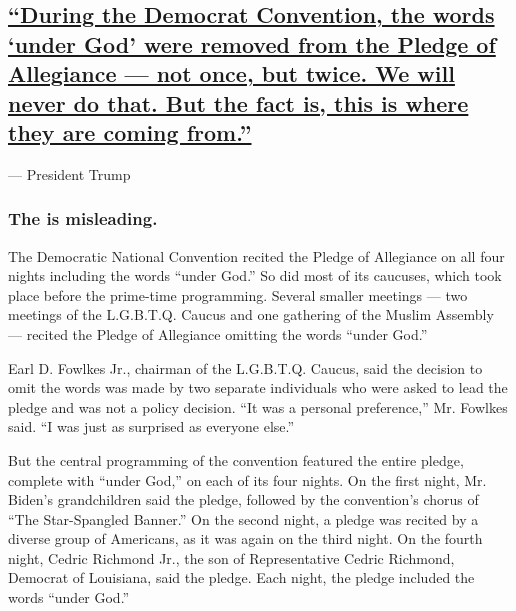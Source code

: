 \hypertarget{during-the-democrat-convention-the-words-under-god-were-removed-from-the-pledge-of-allegiance--not-once-but-twice-we-will-never-do-that-but-the-fact-is-this-is-where-they-are-coming-from}{%
\subsection{\texorpdfstring{\protect\hyperlink{during-the-democrat-convention-the-words-under-god-were-removed-from-the-pledge-of-allegiance-not-once-but-twice-we-will-never-d}{``During
the Democrat Convention, the words `under God' were removed from the
Pledge of Allegiance --- not once, but twice. We will never do that. But
the fact is, this is where they are coming
from.''}}{``During the Democrat Convention, the words `under God' were removed from the Pledge of Allegiance --- not once, but twice. We will never do that. But the fact is, this is where they are coming from.''}}\label{during-the-democrat-convention-the-words-under-god-were-removed-from-the-pledge-of-allegiance--not-once-but-twice-we-will-never-do-that-but-the-fact-is-this-is-where-they-are-coming-from}}

--- President Trump

\hypertarget{the-is-misleading}{%
\subsubsection{The is misleading.}\label{the-is-misleading}}

The Democratic National Convention recited the Pledge of Allegiance on
all four nights including the words ``under God.'' So did most of its
caucuses, which took place before the prime-time programming. Several
smaller meetings --- two meetings of the L.G.B.T.Q. Caucus and one
gathering of the Muslim Assembly --- recited the Pledge of Allegiance
omitting the words ``under God.''

Earl D. Fowlkes Jr., chairman of the L.G.B.T.Q. Caucus, said the
decision to omit the words was made by two separate individuals who were
asked to lead the pledge and was not a policy decision. ``It was a
personal preference,'' Mr. Fowlkes said. ``I was just as surprised as
everyone else.''

But the central programming of the convention featured the entire
pledge, complete with ``under God,'' on each of its four nights. On the
first night, Mr. Biden's grandchildren said the pledge, followed by the
convention's chorus of ``The Star-Spangled Banner.'' On the second
night, a pledge was recited by a diverse group of Americans, as it was
again on the third night. On the fourth night, Cedric Richmond Jr., the
son of Representative Cedric Richmond, Democrat of Louisiana, said the
pledge. Each night, the pledge included the words ``under God.''

